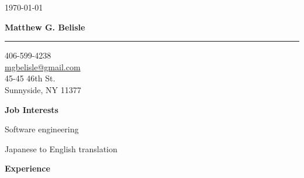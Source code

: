 \documentclass[10pt, a4paper]{article}
\begin{document}
\thispagestyle{empty}
\begin{flushright}
\small \today
\end{flushright}
\begin{center}
\textbf{\Large Matthew G. Belisle}
\rule{\linewidth}{0.5mm}
\end{center}
\begin{flushright}
\begin{minipage}[h]{0.25\linewidth}\small
\begin{flushleft}
406-599-4238\\
\href{mailto:mgbelisle@gmail.com}{mgbelisle@gmail.com}\\
45-45 46th St.\\
Sunnyside, NY 11377
\end{flushleft}
\end{minipage}
\end{flushright}
\textbf{Job Interests}
\begin{itemize*}
  \item Software engineering
  \item Japanese to English translation
\end{itemize*}
\textbf{Experience}
\end{document}
